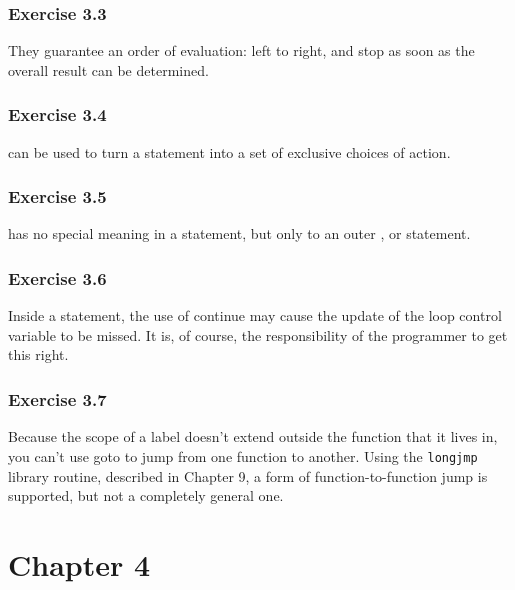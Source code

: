   

  \subsubsection*{Exercise 3.3}

   They guarantee an order of evaluation: left to right, and stop as soon as
    the overall result can be determined.


  

  \subsubsection*{Exercise 3.4}

   \kbreak{} can be used to turn a \switch{} statement
    into a set of exclusive choices of action.


  

  \subsubsection*{Exercise 3.5}

  \continue{} has no special meaning in a \switch{} statement,
  but only to an outer \kdo, \while{} or \for{} statement.


  

  \subsubsection*{Exercise 3.6}

   Inside a \while{} statement, the use of continue may cause the
    update of the loop control variable to be missed. It is, of course, the
    responsibility of the programmer to get this right.


  

  \subsubsection*{Exercise 3.7}

   Because the scope of a label doesn't extend outside the function that it
    lives in, you can't use goto to jump from one function to another. Using
    the \texttt{longjmp} library routine, described in Chapter 9, a form of function-to-function jump is supported, but not
    a completely general one.


  

 
        \section*{Chapter 4}
        

